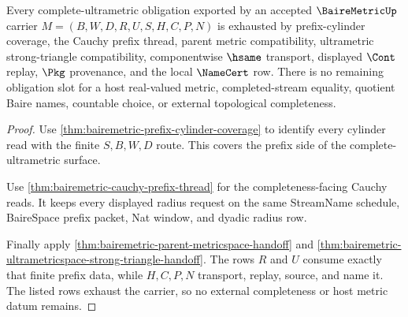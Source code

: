 \begin{theorem}
\label{thm:bairemetric-complete-ultrametric-exhaustion}
Every complete-ultrametric obligation exported by an accepted $\BaireMetricUp$ carrier $M=(B,W,D,R,U,S,H,C,P,N)$ is exhausted by prefix-cylinder coverage, the Cauchy prefix thread, parent metric compatibility, ultrametric strong-triangle compatibility, componentwise $\hsame$ transport, displayed $\Cont$ replay, $\Pkg$ provenance, and the local $\NameCert$ row. There is no remaining obligation slot for a host real-valued metric, completed-stream equality, quotient Baire names, countable choice, or external topological completeness.
\end{theorem}
\begin{proof}
Use \autoref{thm:bairemetric-prefix-cylinder-coverage} to identify every cylinder read with the finite $S,B,W,D$ route. This covers the prefix side of the complete-ultrametric surface.

Use \autoref{thm:bairemetric-cauchy-prefix-thread} for the completeness-facing Cauchy reads. It keeps every displayed radius request on the same StreamName schedule, BaireSpace prefix packet, Nat window, and dyadic radius row.

Finally apply \autoref{thm:bairemetric-parent-metricspace-handoff} and \autoref{thm:bairemetric-ultrametricspace-strong-triangle-handoff}. The rows $R$ and $U$ consume exactly that finite prefix data, while $H,C,P,N$ transport, replay, source, and name it. The listed rows exhaust the carrier, so no external completeness or host metric datum remains.
\end{proof}

